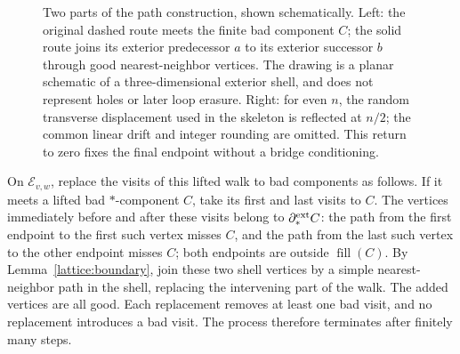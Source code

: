 \begin{figure}[htbp]
\centering
{}
\caption{Two parts of the path construction, shown schematically.
Left: the original dashed route meets the finite bad component $C$;
the solid route joins its exterior predecessor $a$ to its exterior
successor $b$ through good nearest-neighbor vertices.  The drawing is a
planar schematic of a three-dimensional exterior shell, and does not
represent holes or later loop erasure.  Right: for even $n$, the random
transverse displacement used in the skeleton is reflected at $n/2$;
the common linear drift and integer rounding are omitted.  This return
to zero fixes the final endpoint without a bridge conditioning.}
\label{fig:lattice-detour}
\end{figure}

On $\mathcal E_{v,w}$, replace the visits of this lifted walk to bad
components as follows.  If it meets a lifted bad $*$-component $C$,
take its first and last visits to $C$.  The vertices immediately before
and after these visits belong to $\partial_*^{\rm ext}C$: the path
from the first endpoint to the first such vertex misses $C$, and the
path from the last such vertex to the other endpoint misses $C$;
both endpoints are outside $\operatorname{fill}(C)$.  By
Lemma~\ref{lattice:boundary}, join these two shell vertices by a simple
nearest-neighbor path in the shell, replacing the intervening part of
the walk.  The added vertices are all good.  Each replacement removes
at least one bad visit, and no replacement introduces a bad visit.
The process therefore terminates after finitely many steps.

